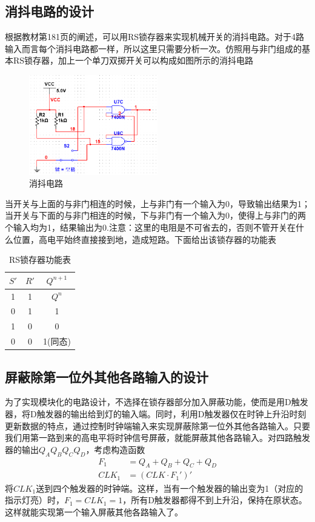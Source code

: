 \documentclass{ctexart}
\begin{document}
\subsection{消抖电路的设计}
根据教材第181页的阐述，可以用RS锁存器来实现机械开关的消抖电路。对于4路输入而言每个消抖电路都一样，所以这里只需要分析一次。仿照用与非门组成的基本RS锁存器，加上一个单刀双掷开关可以构成如图所示的消抖电路
\begin{figure}[H]
    \centering
    \includegraphics[width=0.5\textwidth]{消抖电路.png}
    \caption{消抖电路}
\end{figure}
当开关与上面的与非门相连的时候，上与非门有一个输入为0，导致输出结果为1；当开关与下面的与非门相连的时候，下与非门有一个输入为0，使得上与非门的两个输入均为1，结果输出为0.注意：这里的电阻是不可省去的，否则不管开关在什么位置，高电平始终直接接到地，造成短路。下面给出该锁存器的功能表
\begin{table}[H]
    \centering
    \caption{RS锁存器功能表}
    \begin{tabular}{cc|c}
    \hline 
        $S' $& $R'$ & $Q^{n+1}$ \\ \hline
        1 & 1 & $Q^{n}$ \\ \hline
        0 & 1 & 1 \\ \hline
        1 & 0 & 0 \\ \hline
        0 & 0 & 1(同态) \\ \hline
    \end{tabular}
    \label{RS锁存器功能表}
\end{table}
\subsection{屏蔽除第一位外其他各路输入的设计}
为了实现模块化的电路设计，不选择在锁存器部分加入屏蔽功能，使而是用D触发器，将D触发器的输出给到灯的输入端。同时，利用D触发器仅在时钟上升沿时刻更新数据的特点，通过控制时钟端输入来实现屏蔽除第一位外其他各路输入。只要我们用第一路到来的高电平将时钟信号屏蔽，就能屏蔽其他各路输入。对四路触发器的输出$Q_AQ_BQ_CQ_D$，考虑构造函数
\begin{align}
    F_1&=Q_A+Q_B+Q_C+Q_D\\
    CLK_1&=(CLK\cdot F_1')'
\end{align}
将$CLK_1$送到四个触发器的时钟端。这样，当有一个触发器的输出变为1（对应的指示灯亮）时，$F_1=CLK_1=1$，所有D触发器都得不到上升沿，保持在原状态。这样就能实现第一个输入屏蔽其他各路输入了。
\end{document}
